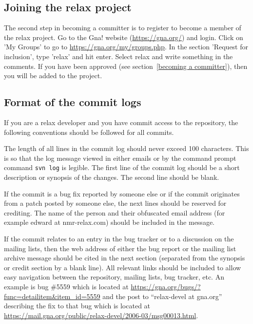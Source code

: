 \subsection{Joining the relax project}

The second step in becoming a committer is to register to become a member of the relax project.  Go to the Gna! website (\href{https://gna.org/}{https://gna.org/}) and login.  Click on 'My Groups' to go to \href{https://gna.org/my/groups.php}{https://gna.org/my/groups.php}.  In the section 'Request for inclusion', type 'relax' and hit enter.  Select relax and write something in the comments.  If you have been approved (see section~\ref{becoming a committer}), then you will be added to the project.


\subsection{Format of the commit logs}\label{commit log format}

If you are a relax developer and you have commit access to the repository, the following conventions should be followed for all commits.

The length of all lines in the commit log should never exceed 100 characters.  This is so that the log message viewed in either emails or by the command prompt command \mbox{\texttt{svn log}} is legible.  The first line of the commit log should be a short description or synopsis of the changes.  The second line should be blank.

If the commit is a bug fix reported by someone else or if the commit originates from a patch posted by someone else, the next lines should be reserved for crediting.  The name of the person and their obfuscated email address (for example edward at nmr-relax.com) should be included in the message.

If the commit relates to an entry in the bug tracker or to a discussion on the mailing lists, then the web address of either the bug report or the mailing list archive message should be cited in the next section (separated from the synopsis or credit section by a blank line).  All relevant links should be included to allow easy navigation between the repository, mailing lists, bug tracker, etc.  An example is bug \#5559 which is located at \href{https://gna.org/bugs/?func=detailitem\&item\_id=5559}{https://gna.org/bugs/?func=detailitem\&item\_id=5559} and the post to ``relax-devel at gna.org'' describing the fix to that bug which is located at \href{https://mail.gna.org/public/relax-devel/2006-03/msg00013.html}{https://mail.gna.org/public/relax-devel/2006-03/msg00013.html}.

